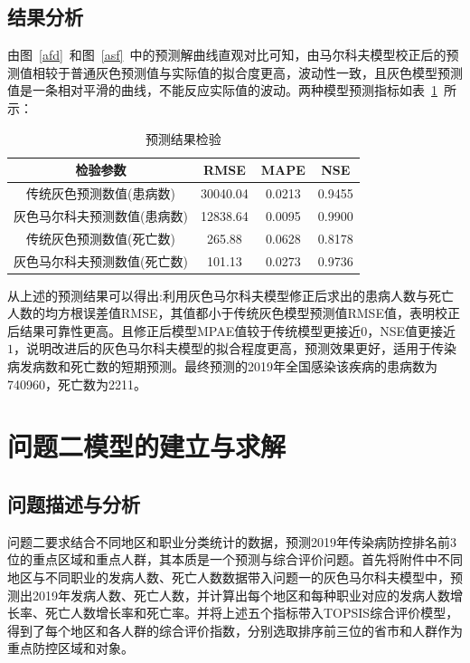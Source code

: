 \documentclass{whutmod}
\begin{document}
   \subsection{结果分析}
	
	由图~\ref{afd}~和图~\ref{asf}~中的预测解曲线直观对比可知，由马尔科夫模型校正后的预测值相较于普通灰色预测值与实际值的拟合度更高，波动性一致，且灰色模型预测值是一条相对平滑的曲线，不能反应实际值的波动。两种模型预测指标如表~\ref{jjj}~所示：
 \begin{table}[H]
	\centering\caption{预测结果检验}\label{jjj}
	\begin{tabular}{cccc}
		\toprule[1.5pt]
		\multicolumn{1}{m{6cm}}{\centering 检验参数}
		& \multicolumn{1}{m{2cm}}{\centering RMSE}
		& \multicolumn{1}{m{2cm}}{\centering MAPE}
		& \multicolumn{1}{m{2cm}}{\centering NSE}
		\\
			\midrule[0.5pt]	
	    传统灰色预测数值(患病数) &   30040.04 &  0.0213 & 0.9455\\ 
		灰色马尔科夫预测数值(患病数)&  12838.64  &  0.0095  &  0.9900 \\ 
		传统灰色预测数值(死亡数) &  265.88   & 0.0628   &0.8178  \\
		灰色马尔科夫预测数值(死亡数) &   101.13 &   0.0273 & 0.9736  \\   
		\bottomrule[1.5pt]	
	\end{tabular}
\end{table} 

    从上述的预测结果可以得出:利用灰色马尔科夫模型修正后求出的患病人数与死亡人数的均方根误差值RMSE，其值都小于传统灰色模型预测值RMSE值，表明校正后结果可靠性更高。且修正后模型MPAE值较于传统模型更接近$0$，NSE值更接近 $1$，说明改进后的灰色马尔科夫模型的拟合程度更高，预测效果更好，适用于传染病发病数和死亡数的短期预测。最终预测的2019年全国感染该疾病的患病数为740960，死亡数为2211。



	  
	  \section{问题二模型的建立与求解}
	  \subsection{问题描述与分析}
	
	问题二要求结合不同地区和职业分类统计的数据，预测2019年传染病防控排名前3位的重点区域和重点人群，其本质是一个预测与综合评价问题。首先将附件中不同地区与不同职业的发病人数、死亡人数数据带入问题一的灰色马尔科夫模型中，预测出2019年发病人数、死亡人数，并计算出每个地区和每种职业对应的发病人数增长率、死亡人数增长率和死亡率。并将上述五个指标带入TOPSIS综合评价模型，得到了每个地区和各人群的综合评价指数，分别选取排序前三位的省市和人群作为重点防控区域和对象。
\end{document}
